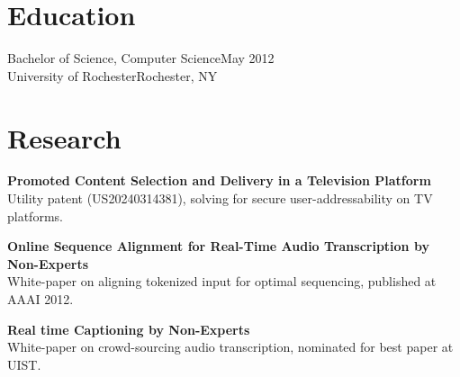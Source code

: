 \section{Education}

  Bachelor of Science, Computer Science\hfill May 2012\\
  University of Rochester\hfill Rochester, NY\\


\section{Research}

  \textbf{Promoted Content Selection and Delivery in a Television Platform} \\
  Utility patent (US20240314381), solving for secure user-addressability on TV platforms.\\

  \vspace{10pt}    

  \textbf{Online Sequence Alignment for Real-Time Audio Transcription by Non-Experts} \\
  White-paper on aligning tokenized input for optimal sequencing, published at AAAI 2012.

  \vspace{10pt}    

  \textbf{Real time Captioning by Non-Experts} \\
  White-paper on crowd-sourcing audio transcription, nominated for best paper at UIST.
  